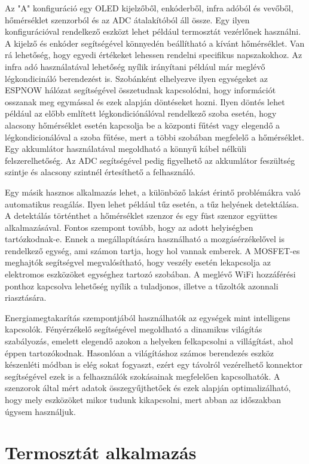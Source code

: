 Az "A" konfiguráció egy OLED kijelzőből, enkóderből, infra adóból és vevőből, hőmérséklet szenzorból és az ADC átalakítóból áll össze. Egy ilyen konfigurációval rendelkező eszközt lehet például termosztát vezérlőnek használni. A kijelző és enkóder segítségével könnyedén beállítható a kívánt hőmérséklet. Van rá lehetőség, hogy egyedi értékeket lehessen rendelni specifikus napszakokhoz. Az infra adó használatával lehetőség nyílik irányítani például már meglévő légkondicináló berendezést is. Szobánként elhelyezve ilyen egységeket az ESPNOW hálózat segítségével összetudnak kapcsolódni, hogy információt osszanak meg egymással és ezek alapján döntéseket hozni. Ilyen döntés lehet például az előbb említett légkondiciónálóval rendelkező szoba esetén, hogy alacsony hőmérséklet esetén kapcsolja be a központi fűtést vagy elegendő a légkondicionálóval a szoba fűtése, mert a többi szobában megfelelő a hőmérséklet. Egy akkumlátor használatával megoldható a könnyű kábel nélküli felszerelhetőség. Az ADC segítségével pedig figyelhető az akkumlátor feszültség szintje és alacsony szintnél értesíthető a felhasználó.

Egy másik hasznos alkalmazás lehet, a különböző lakást érintő problémákra való automatikus reagálás. Ilyen lehet például tűz esetén, a tűz helyének detektálása. A detektálás történthet a hőmérséklet szenzor és egy füst szenzor együttes alkalmazásával. Fontos szempont tovább, hogy az adott helyiségben tartózkodnak-e. Ennek a megállapítására használható a mozgásérzékelővel is rendelkező egység, ami számon tartja, hogy hol vannak emberek. A MOSFET-es meghajtók segítségvel megvalósítható, hogy veszély esetén lekapcsolja az elektromos eszközöket egységhez tartozó szobában. A meglévő WiFi hozzáférési ponthoz kapcsolva lehetőség nyílik a tuladjonos, illetve a tűzoltók azonnali riasztására.

Energiamegtakarítás szempontjából használhatók az egységek mint intelligens kapcsolók. Fényérzékelő segítségével megoldható a dinamikus világítás szabályozás, emelett elegendő azokon a helyeken felkapcsolni a villágítást, ahol éppen tartozókodnak. Hasonlóan a világításhoz számos berendezés eszköz készenléti módban is elég sokat fogyaszt, ezért egy távolról vezérelhető konnektor segítségével ezek is a felhasználók szokásainak megfelelően kapcsolhatók. A szenzorok által mért adatok összegyűjthetőek és ezek alapján optimalizálható, hogy mely eszközöket mikor tudunk kikapcsolni, mert abban az időszakban úgysem használjuk.

\section{Termosztát alkalmazás}

